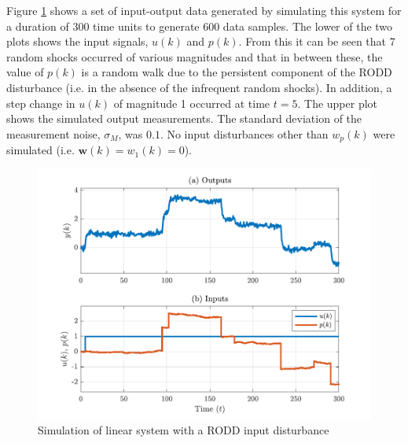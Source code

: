 Figure \ref{fig:sim-sys-siso-ioplot} shows a set of input-output data generated by simulating this system for a duration of 300 time units to generate 600 data samples. The lower of the two plots shows the input signals, $u(k)$ and $p(k)$. From this it can be seen that 7 random shocks occurred of various magnitudes and that in between these, the value of $p(k)$ is a random walk due to the persistent component of the RODD disturbance (i.e. in the absence of the infrequent random shocks). In addition, a step change in $u(k)$ of magnitude 1 occurred at time $t=5$. The upper plot shows the simulated output measurements. The standard deviation of the measurement noise, $\sigma_M$, was $0.1$. No input disturbances other than $w_p(k)$ were simulated (i.e. $\mathbf{w}(k)=w_1(k)=0$). 
\begin{figure}[htp]
	\centering
	\includegraphics[width=14cm]{images/sim_sys_1_3_ioplot.pdf}
	\caption{Simulation of linear system with a RODD input disturbance}
	\label{fig:sim-sys-siso-ioplot}
\end{figure}

